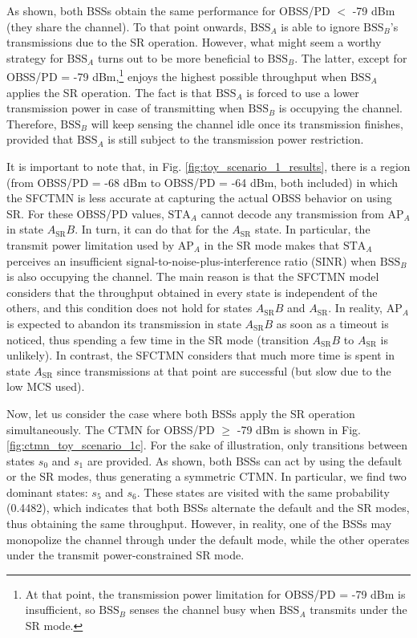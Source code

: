 \documentclass{article}
\begin{document}
As shown, both BSSs obtain the same performance for OBSS/PD $<$ -79 dBm (they share the channel). To that point onwards, $\text{BSS}_A$ is able to ignore $\text{BSS}_B$'s transmissions due to the SR operation. However, what might seem a worthy strategy for $\text{BSS}_A$ turns out to be more beneficial to $\text{BSS}_B$. The latter, except for OBSS/PD = -79 dBm,\footnote{At that point, the transmission power limitation for OBSS/PD = -79 dBm is insufficient, so $\text{BSS}_B$ senses the channel busy when $\text{BSS}_A$ transmits under the SR mode.} enjoys the highest possible throughput when $\text{BSS}_A$ applies the SR operation. The fact is that $\text{BSS}_A$ is forced to use a lower transmission power in case of transmitting when $\text{BSS}_B$ is occupying the channel. Therefore, $\text{BSS}_B$ will keep sensing the channel idle once its transmission finishes, provided that $\text{BSS}_A$ is still subject to the transmission power restriction.

It is important to note that, in Fig. \ref{fig:toy_scenario_1_results}, there is a region (from OBSS/PD = -68 dBm to OBSS/PD = -64 dBm, both included) in which the SFCTMN is less accurate at capturing the actual OBSS behavior on using SR. For these OBSS/PD values, $\text{STA}_A$ cannot decode any transmission from $\text{AP}_A$ in state $A_\text{SR}B$. In turn, it can do that for the $A_\text{SR}$ state. In particular, the transmit power limitation used by $\text{AP}_A$ in the SR mode makes that $\text{STA}_A$ perceives an insufficient signal-to-noise-plus-interference ratio (SINR) when $\text{BSS}_B$ is also occupying the channel. The main reason is that the SFCTMN model considers that the throughput obtained in every state is independent of the others, and this condition does not hold for states $A_\text{SR}B$ and $A_\text{SR}$. In reality, $\text{AP}_A$ is expected to abandon its transmission in state $A_\text{SR}B$ as soon as a timeout is noticed, thus spending a few time in the SR mode (transition $A_\text{SR}B$ to $A_\text{SR}$ is unlikely). In contrast, the SFCTMN considers that much more time is spent in state $A_\text{SR}$ since transmissions at that point are successful (but slow due to the low MCS used).

Now, let us consider the case where both BSSs apply the SR operation simultaneously. The CTMN for OBSS/PD $\geq$ -79 dBm is shown in Fig. \ref{fig:ctmn_toy_scenario_1c}. For the sake of illustration, only transitions between states $s_0$ and $s_1$ are provided. As shown, both BSSs can act by using the default or the SR modes, thus generating a symmetric CTMN. In particular, we find two dominant states: $s_5$  and $s_6$. These states are visited with the same probability (0.4482), which indicates that both BSSs alternate the default and the SR modes, thus obtaining the same throughput. However, in reality, one of the BSSs may monopolize the channel through under the default mode, while the other operates under the transmit power-constrained SR mode. 
\end{document}
